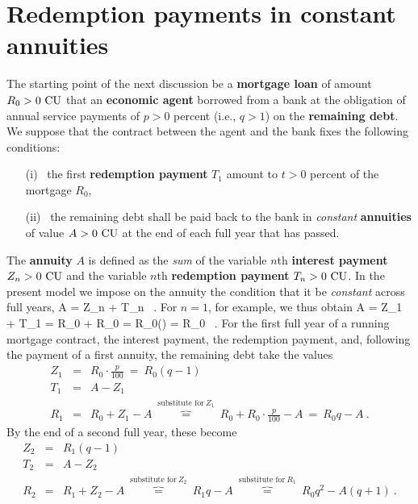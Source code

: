 \section[Redemption payments in constant annuities]%
{Redemption payments in constant annuities}
The starting point of the next discussion be a {\bf mortgage loan} 
of amount $R_{0}>0~{\rm CU}$ that an {\bf economic agent} borrowed 
from a bank at the obligation of annual service payments of $p>0$ 
percent (i.e., $q>1$) on the {\bf remaining debt}. We suppose that 
the contract between the agent and the bank fixes the following 
conditions:
%
\begin{itemize}
\item[(i)]~the first {\bf redemption payment} $T_{1}$ amount to 
$t>0$ percent of the mortgage $R_{0}$,

\item[(ii)]~the remaining debt shall be paid back to the bank in 
\emph{constant} {\bf annuities} of value $A>0~{\rm CU}$ at the end 
of each full year that has passed.
\end{itemize}
%
The {\bf annuity} $A$ is defined as the \emph{sum} of the variable 
$n$th {\bf interest payment} $Z_{n} > 0~{\rm CU}$ and the variable 
$n$th {\bf redemption payment} $T_{n} > 0~{\rm CU}$. In the 
present model we impose on the annuity the condition that it be 
\emph{constant} across full years,
%
\be
{}
A = Z_{n} + T_{n}
\stackrel{!}{=}  \ .
\ee
%
For $n=1$, for example, we thus obtain
%
\be
{}
A = Z_{1} + T_{1}
= R_{0}\cdot{} + R_{0}\cdot{}
= R_{0}\left(\right)
= R_{0}
\stackrel{!}{=}  \ .
\ee
%
For the first full year of a running mortgage contract, the 
interest payment, the redemption payment, and, following the 
payment of a first annuity, the remaining debt take the values
%
\begin{eqnarray*}
Z_{1} & = & R_{0}\cdot\frac{p}{100} \ = \ R_{0}(q-1) \\
%
T_{1} & = & A - Z_{1} \\
%
R_{1} & = & R_{0} + Z_{1} - A
\ \overbrace{=}^{\text{substitute for}\ Z_{1}}
\ R_{0} + R_{0}\cdot\frac{p}{100} - A
\ = \ R_{0}q - A \ .
\end{eqnarray*}
%
By the end of a second full year, these become
%
\begin{eqnarray*}
Z_{2} & = & R_{1}(q-1) \\
%
T_{2} & = & A - Z_{2} \\
%
R_{2} & = & R_{1} + Z_{2} - A
\ \overbrace{=}^{\text{substitute for}\ Z_{2}}
\ R_{1}q - A
\ \overbrace{=}^{\text{substitute for}\ R_{1}}
\ R_{0}q^{2} - A(q+1) \ .
\end{eqnarray*}
